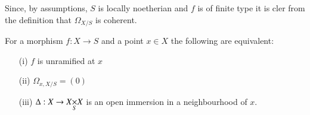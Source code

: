 Since, by assumptions, $S$ is locally noetherian and $f$ is of finite
type it is cler from the definition that $\Omega_{X/S}$ is coherent.

\setcounter{section}{3}
\setcounter{prop}{1}
\begin{prop}\label{chap3-prop3.3.2}
For a morphism $f:X\to S$ and a point $x\in X$ the following are equivalent:
\begin{itemize}
\item[\rm(i)] $f$ is unramified at $x$

\item[\rm(ii)] $\Omega_{x,X/S}=(0)$

\item[\rm(iii)] $\Delta:X\to \fprod{X}{X}{S}$ is an open immersion in a
  neighbourhood of $x$.
\end{itemize}
\end{prop}

